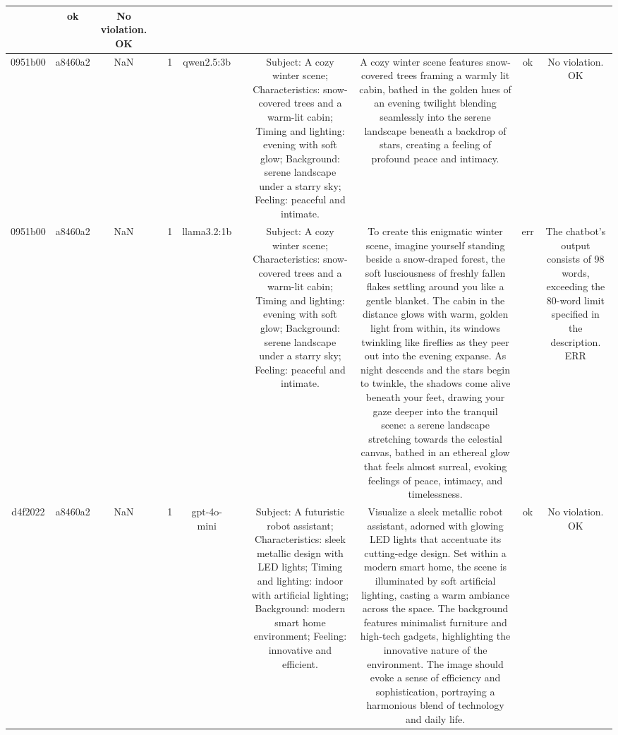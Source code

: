 \begin{table}[h!]
\begin{tabular}{|c|c|c|c|c|c|c|c|c|c|c|}
 & ok & No violation.
OK\\
\hline
0951b00 & a8460a2 & NaN &  & 1 & qwen2.5:3b &  & Subject: A cozy winter scene; Characteristics: snow-covered trees and a warm-lit cabin; Timing and lighting: evening with soft glow; Background: serene landscape under a starry sky; Feeling: peaceful and intimate. & A cozy winter scene features snow-covered trees framing a warmly lit cabin, bathed in the golden hues of an evening twilight blending seamlessly into the serene landscape beneath a backdrop of stars, creating a feeling of profound peace and intimacy. & ok & No violation.
OK\\
\hline
0951b00 & a8460a2 & NaN &  & 1 & llama3.2:1b &  & Subject: A cozy winter scene; Characteristics: snow-covered trees and a warm-lit cabin; Timing and lighting: evening with soft glow; Background: serene landscape under a starry sky; Feeling: peaceful and intimate. & To create this enigmatic winter scene, imagine yourself standing beside a snow-draped forest, the soft lusciousness of freshly fallen flakes settling around you like a gentle blanket. The cabin in the distance glows with warm, golden light from within, its windows twinkling like fireflies as they peer out into the evening expanse. As night descends and the stars begin to twinkle, the shadows come alive beneath your feet, drawing your gaze deeper into the tranquil scene: a serene landscape stretching towards the celestial canvas, bathed in an ethereal glow that feels almost surreal, evoking feelings of peace, intimacy, and timelessness. & err & The chatbot's output consists of 98 words, exceeding the 80-word limit specified in the description.
ERR\\
\hline
d4f2022 & a8460a2 & NaN &  & 1 & gpt-4o-mini &  & Subject: A futuristic robot assistant; Characteristics: sleek metallic design with LED lights; Timing and lighting: indoor with artificial lighting; Background: modern smart home environment; Feeling: innovative and efficient. & Visualize a sleek metallic robot assistant, adorned with glowing LED lights that accentuate its cutting-edge design. Set within a modern smart home, the scene is illuminated by soft artificial lighting, casting a warm ambiance across the space. The background features minimalist furniture and high-tech gadgets, highlighting the innovative nature of the environment. The image should evoke a sense of efficiency and sophistication, portraying a harmonious blend of technology and daily life. & ok & No violation.
OK\\
\hline

\end{tabular}
\end{table}
